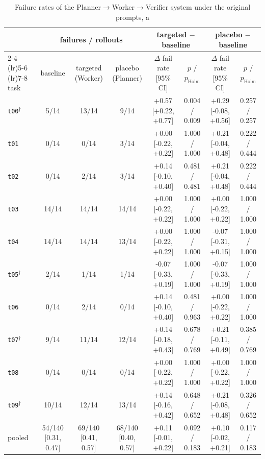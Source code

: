 \begin{table}[t]
\centering\scriptsize
\begin{tabular}{lccccccc}
\toprule
 & \multicolumn{3}{c}{failures / rollouts} & \multicolumn{2}{c}{targeted $-$ baseline} & \multicolumn{2}{c}{placebo $-$ baseline} \\
\cmidrule(lr){2-4} \cmidrule(lr){5-6} \cmidrule(lr){7-8}
task & baseline & targeted (Worker) & placebo (Planner) & $\Delta$ fail rate [95\% CI] & $p$ / $p_{\mathrm{Holm}}$ & $\Delta$ fail rate [95\% CI] & $p$ / $p_{\mathrm{Holm}}$ \\
\midrule
\texttt{t00}$^\dagger$ & 5/14 & 13/14 & 9/14 & +0.57 [+0.22, +0.77] & 0.004 / 0.009 & +0.29 [-0.08, +0.56] & 0.257 / 0.257 \\
\texttt{t01} & 0/14 & 0/14 & 3/14 & +0.00 [-0.22, +0.22] & 1.000 / 1.000 & +0.21 [-0.04, +0.48] & 0.222 / 0.444 \\
\texttt{t02} & 0/14 & 2/14 & 3/14 & +0.14 [-0.10, +0.40] & 0.481 / 0.481 & +0.21 [-0.04, +0.48] & 0.222 / 0.444 \\
\texttt{t03} & 14/14 & 14/14 & 14/14 & +0.00 [-0.22, +0.22] & 1.000 / 1.000 & +0.00 [-0.22, +0.22] & 1.000 / 1.000 \\
\texttt{t04} & 14/14 & 14/14 & 13/14 & +0.00 [-0.22, +0.22] & 1.000 / 1.000 & -0.07 [-0.31, +0.15] & 1.000 / 1.000 \\
\texttt{t05}$^\dagger$ & 2/14 & 1/14 & 1/14 & -0.07 [-0.33, +0.19] & 1.000 / 1.000 & -0.07 [-0.33, +0.19] & 1.000 / 1.000 \\
\texttt{t06} & 0/14 & 2/14 & 0/14 & +0.14 [-0.10, +0.40] & 0.481 / 0.963 & +0.00 [-0.22, +0.22] & 1.000 / 1.000 \\
\texttt{t07}$^\dagger$ & 9/14 & 11/14 & 12/14 & +0.14 [-0.18, +0.43] & 0.678 / 0.769 & +0.21 [-0.11, +0.49] & 0.385 / 0.769 \\
\texttt{t08} & 0/14 & 0/14 & 0/14 & +0.00 [-0.22, +0.22] & 1.000 / 1.000 & +0.00 [-0.22, +0.22] & 1.000 / 1.000 \\
\texttt{t09}$^\dagger$ & 10/14 & 12/14 & 13/14 & +0.14 [-0.16, +0.42] & 0.648 / 0.652 & +0.21 [-0.08, +0.48] & 0.326 / 0.652 \\
\midrule
pooled & 54/140 [0.31, 0.47] & 69/140 [0.41, 0.57] & 68/140 [0.40, 0.57] & +0.11 [-0.01, +0.22] & 0.092 / 0.183 & +0.10 [-0.02, +0.21] & 0.117 / 0.183 \\
\bottomrule
\end{tabular}
\caption{Failure rates of the Planner$\to$Worker$\to$Verifier system under the original prompts, a
}
\end{table}
